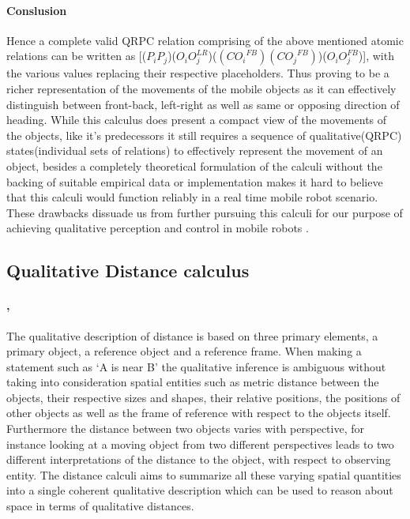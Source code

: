 	\paragraph{Conslusion}Hence a complete valid QRPC relation comprising of the above mentioned atomic relations can be written as [($P_iP_j$)($O_iO_j^{LR}$)($({CO_i}^{FB})({CO_j}^{FB})$)($O_iO_j^{FB}$)], with the various values replacing their respective placeholders. Thus proving to be a richer representation of the movements of the mobile objects as it can effectively distinguish  between front-back, left-right as well as same or opposing direction of heading. While this calculus does present a compact view of the movements of the objects, like it's predecessors it still requires a sequence of qualitative(QRPC) states(individual sets of relations) to effectively represent the movement of an object, besides a completely theoretical formulation of the calculi without the backing of suitable empirical data or implementation makes it hard to believe that this calculi would function reliably in a real time mobile robot scenario. These drawbacks dissuade us from further pursuing this calculi for our purpose of achieving qualitative perception and control in mobile robots \cite{glez2013qrpc}. 
	
	\subsection{Qualitative Distance calculus}
	\paragraph{\cite{clementini1997qualitative}, \cite{zimmermann1996qualitative}} The qualitative description of distance is based on three primary elements, a primary object, a reference object and a reference frame. When making a statement such as `A is near B' the qualitative inference is ambiguous without taking into consideration spatial entities such as metric distance between the objects, their respective sizes and shapes, their relative positions, the positions of other objects as well as the frame of reference with respect to the objects itself. Furthermore the distance between two objects varies with perspective, for instance looking at a moving object from two different perspectives leads to two different interpretations of the distance to the object, with respect to observing entity. The distance calculi aims to summarize all these varying spatial quantities into a single coherent qualitative description which can be used to reason about space in terms of qualitative distances.
